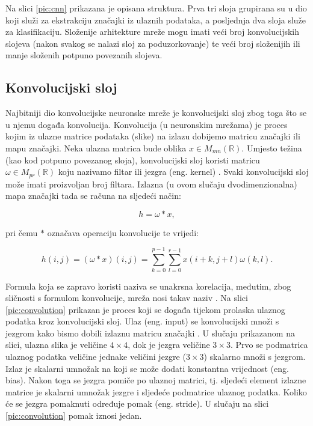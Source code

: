 Na slici \ref{pic:cnn} prikazana je opisana struktura. Prva tri sloja grupirana su
u dio koji služi za ekstrakciju značajki iz ulaznih podataka, a posljednja dva
sloja služe za klasifikaciju. Složenije arhitekture mreže mogu imati veći broj
konvolucijskih slojeva (nakon svakog se nalazi sloj za poduzorkovanje) te veći broj
složenijih ili manje složenih potpuno povezanih slojeva.

\subsection{Konvolucijski sloj}
\label{sub:conv}

Najbitniji dio konvolucijske neuronske mreže je konvolucijski sloj zbog toga što se
u njemu događa konvolucija. Konvolucija (u neuronskim mrežama) je proces kojim 
iz ulazne matrice podataka (slike) na izlazu dobijemo matricu značajki ili
mapu značajki. Neka ulazna matrica bude oblika \( x \in M_{mn}(\mathbb{R}) \).
Umjesto težina (kao kod potpuno povezanog sloja), konvolucijski sloj koristi
matricu \( \omega \in M_{pr}(\mathbb{R}) \) koju nazivamo filtar ili
jezgra (eng. kernel) \cite{keras_layers}. Svaki konvolucijski 
sloj može imati proizvoljan broj filtara. Izlazna (u ovom slučaju dvodimenzionalna)
mapa značajki tada se računa na sljedeći način:

\begin{equation}
h = \omega * x,
\end{equation}

pri čemu \( * \) označava operaciju konvolucije te vrijedi:

\begin{equation}
h(i, j) = (\omega * x)(i, j) = 
\sum_{k=0}^{p-1} \sum_{l=0}^{r-1} x(i + k, j + l) \omega(k, l).
\end{equation}

Formula koja se zapravo koristi naziva se unakrsna korelacija, međutim, zbog sličnosti s 
formulom konvolucije, mreža nosi takav naziv \cite{gracan2020}. Na slici 
\ref{pic:convolution} prikazan je proces koji se događa tijekom prolaska 
ulaznog podatka kroz konvolucijski sloj. Ulaz (eng. input) se konvolucijski množi
s jezgrom kako bismo dobili izlaznu matricu značajki \cite{cnn_how}. U slučaju prikazanom na slici,
ulazna slika je veličine \(4 \times 4\), dok je jezgra veličine \(3 \times 3\). Prvo se podmatrica ulaznog
podatka veličine jednake veličini jezgre (\(3 \times 3\)) skalarno množi s jezgrom. Izlaz je 
skalarni umnožak na koji se može dodati konstantna vrijednost (eng. bias). Nakon
toga se jezgra pomiče po ulaznoj matrici, tj. sljedeći element izlazne matrice je
skalarni umnožak jezgre i sljedeće podmatrice ulaznog podatka. Koliko će se jezgra
pomaknuti određuje pomak (eng. stride). U slučaju na slici \ref{pic:convolution}
pomak iznosi jedan.

